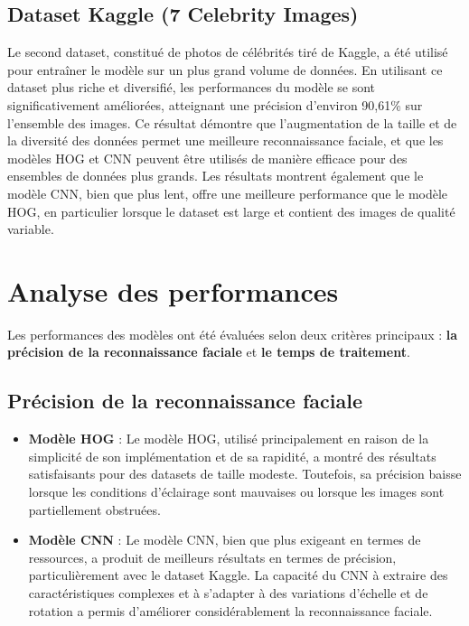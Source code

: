 \documentclass[a4paper,12pt]{report}
\begin{document}
\subsection{Dataset Kaggle (7 Celebrity Images)}
Le second dataset, constitué de photos de célébrités tiré de Kaggle, a été utilisé pour entraîner le modèle sur un plus grand volume de données. En utilisant ce dataset plus riche et diversifié, les performances du modèle se sont significativement améliorées, atteignant une précision d’environ 90,61\% sur l’ensemble des images. Ce résultat démontre que l'augmentation de la taille et de la diversité des données permet une meilleure reconnaissance faciale, et que les modèles HOG et CNN peuvent être utilisés de manière efficace pour des ensembles de données plus grands.
Les résultats montrent également que le modèle CNN, bien que plus lent, offre une meilleure performance que le modèle HOG, en particulier lorsque le dataset est large et contient des images de qualité variable.

\section{Analyse des performances}
Les performances des modèles ont été évaluées selon deux critères principaux : \textbf{la précision de la reconnaissance faciale} et \textbf{le temps de traitement}.

\subsection{Précision de la reconnaissance faciale}
\begin{itemize}
    \item \textbf{Modèle HOG} : Le modèle HOG, utilisé principalement en raison de la simplicité de son implémentation et de sa rapidité, a montré des résultats satisfaisants pour des datasets de taille modeste. Toutefois, sa précision baisse lorsque les conditions d'éclairage sont mauvaises ou lorsque les images sont partiellement obstruées.
    \item \textbf{Modèle CNN} : Le modèle CNN, bien que plus exigeant en termes de ressources, a produit de meilleurs résultats en termes de précision, particulièrement avec le dataset Kaggle. La capacité du CNN à extraire des caractéristiques complexes et à s'adapter à des variations d'échelle et de rotation a permis d'améliorer considérablement la reconnaissance faciale.
\end{itemize}
\end{document}
